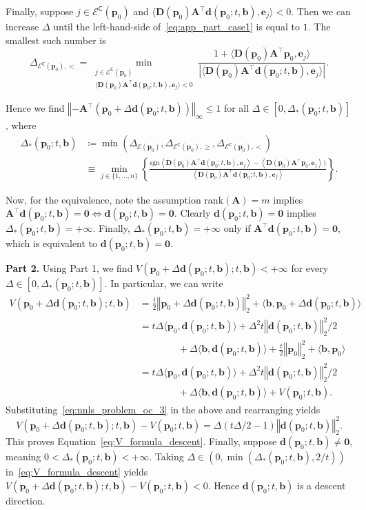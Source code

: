 \documentclass[11pt]{article}
\numberwithin{prop}{section}
\numberwithin{lem}{section}
\numberwithin{rem}{section}
\numberwithin{cor}{section}
\numberwithin{thm}{section}
\numberwithin{defn}{section}
\numberwithin{fact}{section}
\theoremstyle{plain}
\def\bb {\boldsymbol{b}}
\def\bd {\boldsymbol{d}}
\def\be {\boldsymbol{e}}
\def\bp {\boldsymbol{p}}
\newcommand{\normsq}[1]{\left\Vert{#1} \right\Vert_{2}^{2}}
\newcommand{\norminf}[1]{\left\Vert{#1} \right\Vert_{\infty}}
\newcommand{\matr}[1]{\bm{#1}}
\def\sign {\mathrm{sgn}}
\newcommand{\rank}[1]{\mathrm{rank}({#1})}
\def\bpo {\bp_{0}}
\def\epo {\mathcal{E}(\bp_{0})}
\def\ecpo {\mathcal{E}^{\mathsf{C}}(\bp_{0})}
\def\Atop {\matr{A}^{\top}}
\begin{document}
Finally, suppose $j \in \ecpo$ and $\langle \matr{D}(\bpo)\Atop\bd(\bpo;t,\bb),\be_j\rangle < 0$. Then we can increase $\Delta$ until the left-hand-side of~\eqref{eq:app_part_case1} is equal to $1$. The smallest such number is
\[
\Delta_{\ecpo,<} = \min_{\substack{j \in \ecpo\\ \langle \matr{D}(\bpo)\Atop\bd(\bpo;t,\bb),\be_j\rangle < 0}} \frac{1 + \langle \matr{D}(\bpo)\Atop\bpo,\be_j\rangle}{|\langle \matr{D}(\bpo)\Atop\bd(\bpo;t,\bb),\be_j\rangle|}.
\]


Hence we find $\norminf{-\Atop(\bpo + \Delta\bd(\bpo;t,\bb))} \leqslant 1$ for all $\Delta \in [0,\Delta_{*}(\bpo;t,\bb)]$, where 
\[
\begin{alignedat}{1}
\Delta_{*}(\bpo;t,\bb) &\coloneqq \min{(\Delta_{\epo},\Delta_{\ecpo,\geqslant},\Delta_{\ecpo,<})} \\
&\equiv \min_{j \in \{1,\dots,n\}} \left\{\frac{\sign{\left\langle \matr{D}(\bpo)\Atop\bd(\bpo;t,\bb),\be_j\right\rangle} - \left\langle \matr{D}(\bpo)\Atop\bpo,\be_j\right\rangle)}{\left\langle\matr{D}(\bpo) \Atop\bd(\bpo;t,\bb),\be_j\right\rangle} \right\}.
\end{alignedat}
\]


Now, for the equivalence, note the assumption $\rank{\matr{A}} = m$ implies $\Atop\bd(\bpo;t,\bb) = \boldsymbol{0} \iff \bd(\bpo;t,\bb) = \boldsymbol{0}$. Clearly $\bd(\bpo;t,\bb) = \boldsymbol{0}$ implies $\Delta_{*}(\bpo;t,\bb) = +\infty$. Finally, $\Delta_{*}(\bpo;t,\bb) = +\infty$ only if $\Atop\bd(\bpo;t,\bb) = \boldsymbol{0}$, which is equivalent to $\bd(\bpo;t,\bb) = \boldsymbol{0}$. 


\noindent
\newline
\textbf{Part 2.} Using Part 1, we find $V(\bpo + \Delta\bd(\bpo;t,\bb); t,\bb) < +\infty$ for every $\Delta \in [0,\Delta_{*}(\bpo;t,\bb)]$. In particular, we can write
\[
\begin{alignedat}{1}
V(\bpo + \Delta\bd(\bpo;t,\bb); t,\bb) &= \frac{t}{2}\normsq{\bpo + \Delta\bd(\bpo;t,\bb)} + \langle\bb,\bpo + \Delta\bd(\bpo;t,\bb)\rangle \\
&= t \Delta\langle\bpo,\bd(\bpo;t,\bb)\rangle + \Delta^{2}t \normsq{\bd(\bpo;t,\bb)}/2 \\
&\qquad\qquad + \Delta\langle\bb,\bd(\bpo;t,\bb)\rangle + \frac{t}{2}\normsq{\bpo} + \langle\bb,\bpo\rangle \\
&= t \Delta\langle\bpo,\bd(\bpo;t,\bb)\rangle + \Delta^{2}t \normsq{\bd(\bpo;t,\bb)}/2 \\
&\qquad \qquad + \Delta\langle\bb,\bd(\bpo;t,\bb)\rangle + V(\bpo;t,\bb).
\end{alignedat}
\]
Substituting~\eqref{eq:nnls_problem_oc_3} in the above and rearranging yields
\[
V(\bpo + \Delta\bd(\bpo;t,\bb); t,\bb) - V(\bpo;t,\bb) = \Delta(t \Delta/2 - 1)\normsq{\bd(\bpo;t,\bb)}.
\]
This proves Equation~\eqref{eq:V_formula_descent}. Finally, suppose $\bd(\bpo;t,\bb) \neq \boldsymbol{0}$, meaning $0 < \Delta_{*}(\bpo;t,\bb) < +\infty$. Taking $\Delta \in (0,\min(\Delta_{*}(\bpo;t,\bb),2/t))$ in~\eqref{eq:V_formula_descent} yields $V(\bpo + \Delta\bd(\bpo;t,\bb); t,\bb) - V(\bpo;t,\bb) < 0$. Hence $\bd(\bpo;t,\bb)$ is a descent direction. 
\end{document}

